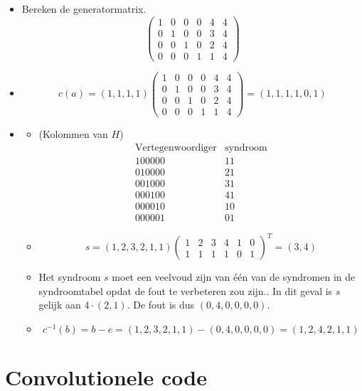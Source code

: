 \documentclass[main.tex]{subfiles}
\begin{document}
\begin{itemize}
\item Bereken de generatormatrix.
\[
\begin{pmatrix}
  1 & 0 & 0 & 0 & 4 & 4\\
  0 & 1 & 0 & 0 & 3 & 4\\
  0 & 0 & 1 & 0 & 2 & 4\\
  0 & 0 & 0 & 1 & 1 & 4
\end{pmatrix}
\]
\item
  \[ 
  c(a) = (1,1,1,1)
  \begin{pmatrix}
    1 & 0 & 0 & 0 & 4 & 4\\
    0 & 1 & 0 & 0 & 3 & 4\\
    0 & 0 & 1 & 0 & 2 & 4\\
    0 & 0 & 0 & 1 & 1 & 4
  \end{pmatrix}
  = (1,1,1,1,0,1)
  \]
\item
  \begin{itemize}
  \item (Kolommen van $H$)
    \[
    \begin{array}{c|c}
      \text{Vertegenwoordiger} & \text{syndroom}\\\hline
      100000 & 11\\
      010000 & 21\\
      001000 & 31\\
      000100 & 41\\
      000010 & 10\\
      000001 & 01
    \end{array}
    \]
  \item 
    \[
    s = (1,2,3,2,1,1)
    \begin{pmatrix}
      1 & 2 & 3 & 4 & 1 & 0\\
      1 & 1 & 1 & 1 & 0 & 1
    \end{pmatrix}^{T}
    = (3,4)
    \]
  \item Het syndroom $s$ moet een veelvoud zijn van \'e\'en van de syndromen in de syndroomtabel opdat de fout te verbeteren zou zijn..
    In dit geval is $s$ gelijk aan $4\cdot (2,1)$.
    De fout is dus $(0,4,0,0,0,0)$.
  \item 
    \[
    c^{-1}(b) = b-e= (1,2,3,2,1,1) - (0,4,0,0,0,0)= (1,2,4,2,1,1)
    \]
  \end{itemize}
\end{itemize}

\newpage
\section{Convolutionele code}
\end{document}
